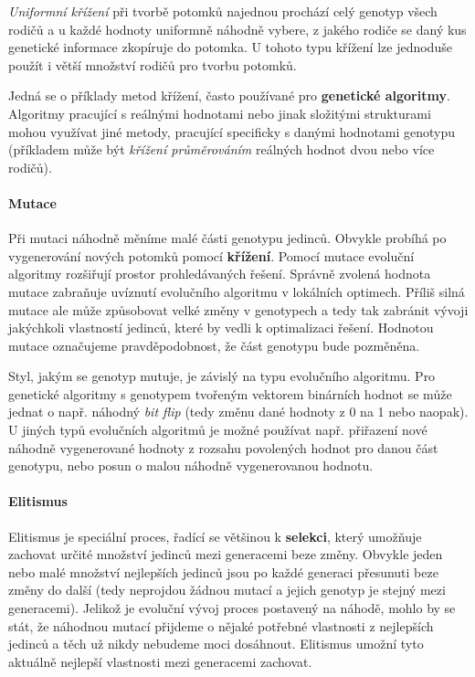 \emph{Uniformní křížení} při tvorbě potomků najednou prochází celý genotyp
všech rodičů a u každé hodnoty uniformně náhodně vybere, z jakého rodiče se
daný kus genetické informace zkopíruje do potomka. U tohoto typu křížení lze
jednoduše použít i větší množství rodičů pro tvorbu potomků.

Jedná se o příklady metod křížení, často používané pro \textbf{genetické
algoritmy}. Algoritmy pracující s reálnými hodnotami nebo jinak složitými
strukturami mohou využívat jiné metody, pracující specificky s danými hodnotami
genotypu (příkladem může být \emph{křížení průměrováním} reálných hodnot dvou
nebo více rodičů). 

\paragraph{Mutace}
Při mutaci náhodně měníme malé části genotypu jedinců. Obvykle probíhá po
vygenerování nových potomků pomocí \textbf{křížení}. Pomocí mutace evoluční
algoritmy rozšiřují prostor prohledávaných řešení. Správně zvolená hodnota
mutace zabraňuje uvíznutí evolučního algoritmu v lokálních optimech. Příliš
silná mutace ale může způsobovat velké změny v genotypech a tedy tak zabránit
vývoji jakýchkoli vlastností jedinců, které by vedli k optimalizaci řešení.
Hodnotou mutace označujeme pravděpodobnost, že část genotypu bude pozměněna.

Styl, jakým se genotyp mutuje, je závislý na typu evolučního algoritmu. Pro
genetické algoritmy s genotypem tvořeným vektorem binárních hodnot se může
jednat o např. náhodný \emph{bit flip} (tedy změnu dané hodnoty z 0 na 1 nebo
naopak). U jiných typů evolučních algoritmů je možné používat např. přiřazení
nové náhodně vygenerované hodnoty z rozsahu povolených hodnot pro danou část
genotypu, nebo posun o malou náhodně vygenerovanou hodnotu.

\paragraph{Elitismus}
Elitismus je speciální proces, řadící se většinou k \textbf{selekci}, který
umožňuje zachovat určité množství jedinců mezi generacemi beze změny. Obvykle
jeden nebo malé množství nejlepších jedinců jsou po každé generaci přesunuti
beze změny do další (tedy neprojdou žádnou mutací a jejich genotyp je stejný
mezi generacemi). Jelikož je evoluční vývoj proces postavený na náhodě, mohlo
by se stát, že náhodnou mutací přijdeme o nějaké potřebné vlastnosti z
nejlepších jedinců a těch už nikdy nebudeme moci dosáhnout. Elitismus umožní
tyto aktuálně nejlepší vlastnosti mezi generacemi zachovat.

